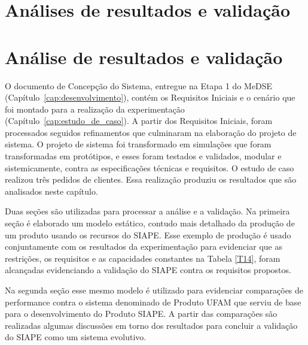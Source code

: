 \documentclass[10pt,letterpaper,twocolumn]{IEEEtran}
\begin{document}
\section{Análises de resultados e validação}


\section{Análise de resultados e validação}

O documento de Concepção do Sistema, entregue na Etapa 1 do MeDSE (Capítulo~\ref{cap:desenvolvimento}), 
contém os Requisitos Iniciais e o cenário que foi montado para a realização da experimentação 
(Capítulo~\ref{cap:estudo_de_caso}). A partir dos Requisitos Iniciais, foram processados seguidos 
refinamentos que culminaram na elaboração do projeto de sistema. O projeto de sistema foi transformado 
em simulações que foram transformadas em protótipos, e esses foram testados e validados, modular e 
sistemicamente, contra as especificações técnicas e requisitos. O estudo de caso realizou três pedidos
de clientes. Essa realização produziu os resultados que são analisados neste capítulo.

Duas seções são utilizadas para processar a análise e a validação. Na primeira seção é elaborado um modelo
estático, contudo mais detalhado da produção de um produto usando os recursos do SIAPE. Esse exemplo de 
produção é usado conjuntamente com os resultados da experimentação para evidenciar que as restrições, os
requisitos e as capacidades constantes na Tabela \ref{T14}, foram alcançadas evidenciando a validação do 
SIAPE contra os requisitos propostos.

Na segunda seção esse mesmo modelo é utilizado para evidenciar comparações de performance contra o sistema 
denominado de Produto UFAM que serviu de base para o desenvolvimento do Produto SIAPE. A partir das 
comparações são realizadas algumas discussões em torno dos resultados para concluir a validação do SIAPE 
como um sistema evolutivo.  
\end{document}
